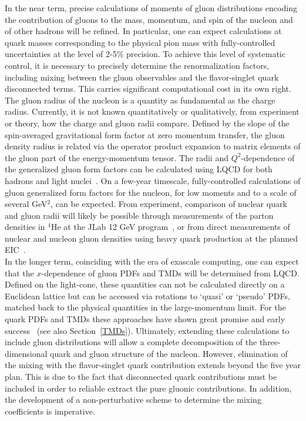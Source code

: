
In the near term, precise calculations of moments of gluon distributions encoding the contribution of gluons to the mass, momentum, and spin of the nucleon and of other hadrons will be refined. In particular, one can expect calculations at quark masses corresponding to the physical pion mass with fully-controlled uncertainties at the level of 2-5\% precision. To achieve this level of systematic control, it is necessary to precisely determine the renormalization factors, including mixing between the gluon observables and the flavor-singlet quark disconnected terms. This carries significant computational cost in its own right.\\
 


The gluon radius of the nucleon is a quantity as fundamental as the charge radius. Currently, it is not known quantitatively or qualitatively, from experiment or theory, how the charge and gluon radii compare. 
Defined by the slope of the spin-averaged gravitational form factor at zero momentum transfer, the gluon density radius is related via the operator product expansion to matrix elements of the gluon part of the energy-momentum tensor.
The radii and $Q^2$-dependence of the generalized gluon form factors can be calculated using LQCD for both hadrons and light nuclei~\cite{Detmold:2017oqb,Winter:2017bfs}.
On a few-year timescale, fully-controlled calculations of gluon generalized form factors for the nucleon, for low moments and to a scale of several GeV$^2$, can be expected.
From experiment, comparison of nuclear quark and gluon radii will likely be possible through measurements of the parton densities in ${}^4$He at the JLab 12 GeV program~\cite{Hattawy:2017woc}, or from direct measurements of nuclear and nucleon gluon densities using heavy quark production at the planned EIC~\cite{Chudakov:2016otl}. \\



In the longer term, coinciding with the era of exascale computing, one can expect that the $x$-dependence of gluon PDFs and TMDs will be determined from LQCD. Defined on the light-cone, these quantities can not be calculated directly on a Euclidean lattice but can be accessed via rotations to `quasi' or `pseudo' PDFs, matched back to the physical quantities in the large-momentum limit. For the quark PDFs and TMDs these approaches have shown great promise and early success~\cite{Lin:2014zya,Alexandrou:2015rja} (see also Section~\ref{TMDs}). Ultimately, extending these calculations to include gluon distributions will allow a complete decomposition of the three-dimensional quark and gluon structure of the nucleon. However, elimination of the mixing with the flavor-singlet quark contribution extends beyond the five year plan. This is due to the fact that disconnected quark contributions must be included in order to reliable extract the pure gluonic contributions. In addition, the development of a non-perturbative scheme to determine the mixing coefficients is imperative.  \\

